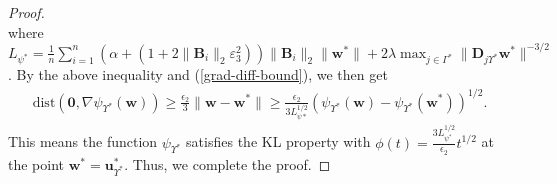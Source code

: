 \documentclass{article}
\numberwithin{equation}{section}
\begin{document}
\begin{proof}
\begin{equation}
\end{equation}
where $L_{\psi^*}=\frac{1}{n}\sum_{i=1}^n(\alpha+(1+2\|\mathbf{B}_i\|_2\varepsilon_3^2))\|\mathbf{B}_i\|_2\|\mathbf{w}^*\|
+2\lambda\max_{j\in\Gamma^*}\|\mathbf{D}_{j\Upsilon^*}\mathbf{w}^*\|^{-3/2}$.
By the above inequality and (\ref{grad-diff-bound}), we then get
\begin{equation}\label{KL-half}
	\begin{aligned}
		\mathrm{dist}(\mathbf{0}, \nabla\psi_{\Upsilon^*}(\mathbf{w}))\geq\frac{\epsilon_2}{3}\|\mathbf{w}-\mathbf{w}^*\|
		\geq\frac{\epsilon_2}{3L_{\psi*}^{1/2}}(\psi_{\Upsilon^*}(\mathbf{w})-\psi_{\Upsilon^*}(\mathbf{w}^*))^{1/2}.
	\end{aligned}\nonumber
\end{equation}
This means the function $\psi_{\Upsilon^*}$ satisfies the KL property with $\phi(t)=\frac{3L_{\psi^*}^{1/2}}{\epsilon_2}t^{1/2}$ at the point $\mathbf{w}^*=\mathbf{u}_{\Upsilon^*}^*$. Thus, we complete the proof. 
\end{proof}
\end{document}
